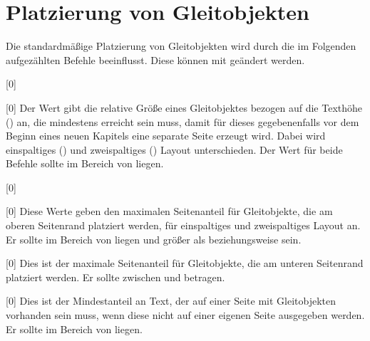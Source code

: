 \section{Platzierung von Gleitobjekten}
\label{sec:tips:floats}
Die standardmäßige Platzierung von Gleitobjekten wird durch die im Folgenden 
aufgezählten Befehle beeinflusst. Diese können mit 
 geändert werden.

\begin{Declaration}{}[0\floatpagefraction]
\begin{Declaration}{}[0\dblfloatpagefraction]
\printdeclarationlist*%
%
Der Wert gibt die relative Größe eines Gleitobjektes bezogen auf die Texthöhe 
() an, die mindestens erreicht sein muss, damit für dieses 
gegebenenfalls vor dem Beginn eines neuen Kapitels eine separate Seite erzeugt 
wird. Dabei wird einspaltiges () und zweispaltiges 
() Layout unterschieden. Der Wert für beide 
Befehle sollte im Bereich von  liegen.
\end{Declaration}
\end{Declaration}

\begin{Declaration}{}[0\topfraction]
\begin{Declaration}{}[0\dbltopfraction]
\printdeclarationlist*%
%
Diese Werte geben den maximalen Seitenanteil für Gleitobjekte, die am oberen 
Seitenrand platziert werden, für einspaltiges und zweispaltiges Layout an. Er 
sollte im Bereich von  liegen und größer als 
 beziehungsweise  sein.
\end{Declaration}
\end{Declaration}

\begin{Declaration}{}[0\bottomfraction]
\printdeclarationlist*%
%
Dies ist der maximale Seitenanteil für Gleitobjekte, die am unteren Seitenrand 
platziert werden. Er sollte zwischen  und  betragen.
\end{Declaration}

\begin{Declaration}{}[0\textfraction]
\printdeclarationlist*%
%
Dies ist der Mindestanteil an Text, der auf einer Seite mit Gleitobjekten 
vorhanden sein muss, wenn diese nicht auf einer eigenen Seite ausgegeben 
werden. Er sollte im Bereich von  liegen.
\end{Declaration}

